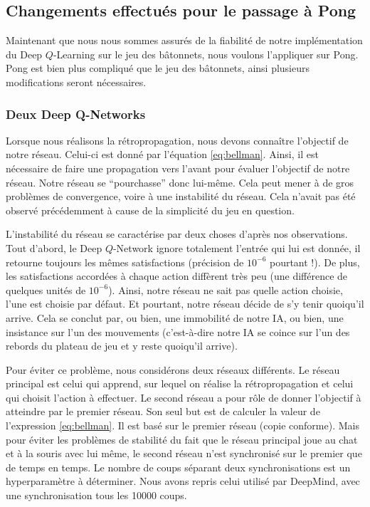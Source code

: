 \subsection{Changements effectués pour le passage à Pong}

Maintenant que nous nous sommes assurés de la fiabilité de notre implémentation du Deep $Q$-Learning sur le jeu des bâtonnets, nous voulons l'appliquer sur Pong.
Pong est bien plus compliqué que le jeu des bâtonnets, ainsi plusieurs modifications seront nécessaires.

\subsubsection{Deux Deep Q-Networks}

Lorsque nous réalisons la rétropropagation, nous devons connaître l'objectif de notre réseau. Celui-ci est donné par l'équation \ref{eq:bellman}. Ainsi, il est
nécessaire de faire une propagation vers l'avant pour évaluer l'objectif de notre réseau. Notre réseau se ``pourchasse'' donc lui-même. Cela peut mener à de gros 
problèmes de convergence, voire à une instabilité du réseau. Cela n'avait pas été observé précédemment à cause de la simplicité du jeu en question.

L'instabilité du réseau se caractérise par deux choses d'après nos observations. Tout d'abord, le Deep $Q$-Network ignore totalement l'entrée qui lui est donnée,
il retourne toujours les mêmes satisfactions (précision de $10^{-6}$ pourtant !). De plus, les satisfactions accordées à chaque action diffèrent très peu
(une différence de quelques unités de $10^{-6}$). Ainsi, notre réseau ne sait pas quelle action choisie, l'une est choisie par défaut. Et pourtant, notre réseau
décide de s'y tenir quoiqu'il arrive. Cela se conclut par, ou bien, une immobilité de notre IA, ou bien, une insistance sur l'un des mouvements (c'est-à-dire notre
IA se coince sur l'un des rebords du plateau de jeu et y reste quoiqu'il arrive).

Pour éviter ce problème, nous considérons deux réseaux différents. Le réseau principal est celui qui apprend, sur lequel on réalise la rétropropagation et celui
qui choisit l'action à effectuer. Le second réseau a pour rôle de donner l'objectif à atteindre par le premier réseau. Son seul but est de calculer la valeur
de l'expression \ref{eq:bellman}. Il est basé sur le premier réseau (copie conforme). Mais pour éviter les problèmes de stabilité du fait que le réseau principal 
joue au chat et à la souris avec lui même, le second réseau n'est synchronisé sur le premier que de temps en temps. Le nombre de coups séparant deux 
synchronisations est un hyperparamètre à déterminer. Nous avons repris celui utilisé par DeepMind, avec une synchronisation tous les 10000 coups.

